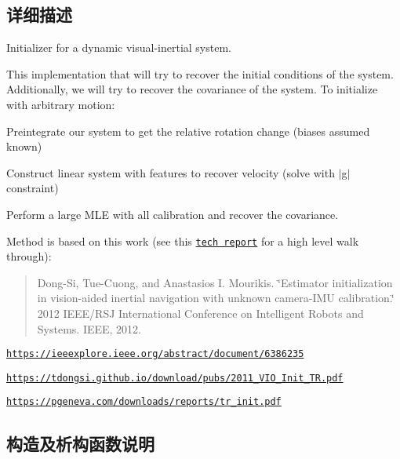 \subsection{详细描述}
Initializer for a dynamic visual-\/inertial system. 

This implementation that will try to recover the initial conditions of the system. Additionally, we will try to recover the covariance of the system. To initialize with arbitrary motion\+:
\begin{DoxyEnumerate}
\item Preintegrate our system to get the relative rotation change (biases assumed known)
\item Construct linear system with features to recover velocity (solve with $\vert$g$\vert$ constraint)
\item Perform a large M\+LE with all calibration and recover the covariance.
\end{DoxyEnumerate}

Method is based on this work (see this \href{https://pgeneva.com/downloads/reports/tr_init.pdf}{\tt tech report} for a high level walk through)\+:

\begin{quote}
Dong-\/\+Si, Tue-\/\+Cuong, and Anastasios I. Mourikis. \char`\"{}\+Estimator initialization in vision-\/aided inertial navigation with unknown camera-\/\+I\+M\+U calibration.\char`\"{} 2012 I\+E\+E\+E/\+R\+SJ International Conference on Intelligent Robots and Systems. I\+E\+EE, 2012. \end{quote}



\begin{DoxyItemize}
\item \href{https://ieeexplore.ieee.org/abstract/document/6386235}{\tt https\+://ieeexplore.\+ieee.\+org/abstract/document/6386235}
\item \href{https://tdongsi.github.io/download/pubs/2011_VIO_Init_TR.pdf}{\tt https\+://tdongsi.\+github.\+io/download/pubs/2011\+\_\+\+V\+I\+O\+\_\+\+Init\+\_\+\+T\+R.\+pdf}
\item \href{https://pgeneva.com/downloads/reports/tr_init.pdf}{\tt https\+://pgeneva.\+com/downloads/reports/tr\+\_\+init.\+pdf} 
\end{DoxyItemize}

\subsection{构造及析构函数说明}
\mbox{\label{classov__init_1_1DynamicInitializer_a11e592324aedffe4a5b984cf9651a6ab}} 
